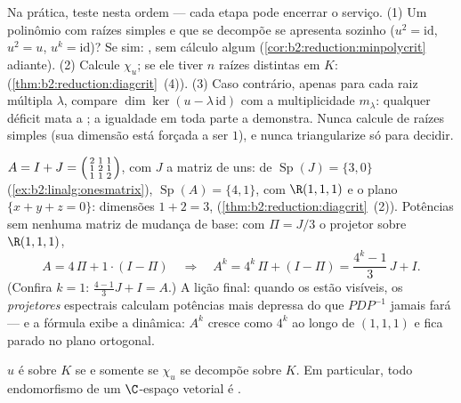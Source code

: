 \begin{method}\label{met:b2:reduction:decide}
Na prática, teste nesta ordem --- cada etapa pode encerrar o
serviço. (1) Um polinômio  com raízes simples e
que se decompõe se apresenta sozinho ($u^2 = \mathrm{id}$, $u^2 = u$, $u^k =
\mathrm{id}$)? Se sim: , sem cálculo algum
(\cref{cor:b2:reduction:minpolycrit} adiante). (2) Calcule
$\chi_u$; se ele tiver $n$ raízes distintas em $K$: 
(\cref{thm:b2:reduction:diagcrit}~(4)). (3) Caso contrário, apenas para cada raiz
múltipla $\lambda$, compare $\dim\ker(u -
\lambda\,\mathrm{id})$ com a multiplicidade $m_\lambda$: qualquer
déficit mata a ; a igualdade em toda parte a demonstra.
Nunca calcule  de raízes simples (sua dimensão está
forçada a ser $1$), e nunca triangularize só para decidir.
\end{method}

\begin{example}\label{ex:b2:reduction:diagwork}
$A = I + J = \begin{psmallmatrix}2 & 1 & 1\\ 1 & 2 & 1\\ 1 & 1 &
2\end{psmallmatrix}$, com $J$ a matriz de uns: de
$\operatorname{Sp}(J) = \{3, 0\}$
(\cref{ex:b2:linalg:onesmatrix}), $\operatorname{Sp}(A) = \{4,
1\}$, com  $\R(1,1,1)$ e o plano $\{x + y + z =
0\}$: dimensões $1 + 2 = 3$, 
(\cref{thm:b2:reduction:diagcrit}~(2)). Potências sem nenhuma
matriz de mudança de base: com $\Pi = J/3$ o projetor sobre
$\R(1,1,1)$,
\[
A = 4\,\Pi + 1\cdot(I - \Pi)
\quad\Longrightarrow\quad
A^k = 4^k\,\Pi + (I - \Pi)
= \frac{4^k - 1}{3}\,J + I .
\]
(Confira $k = 1$: $\frac{4-1}3 J + I = A$.) A lição final:
quando os  estão visíveis, os \emph{projetores} espectrais
calculam potências mais depressa do que $PDP^{-1}$ jamais fará --- e a
fórmula exibe a dinâmica: $A^k$ cresce como $4^k$ ao longo de
$(1,1,1)$ e fica parado no plano ortogonal.
\end{example}

\begin{theorem}[Triangularização]\label{thm:b2:reduction:trigonalization}
$u$ é  sobre $K$ se e somente se $\chi_u$ se decompõe sobre
$K$. Em particular, todo endomorfismo de um $\C$-espaço vetorial é
.
\end{theorem}

